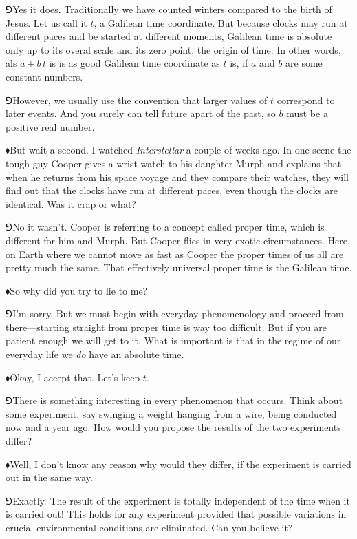 \documentclass[10pt,oneside%
]{memoir}
\newcommand{\hea}{\(\blacklozenge\)\;}
\newcommand{\heb}{\(\Game\)\;}
\begin{document}
\heb Yes it does. Traditionally we have counted winters compared to the birth of Jesus. Let us call it \(t\), a Galilean time coordinate. But because clocks may run at different paces and be started at different moments, Galilean time is absolute only up to its overal scale and its zero point, the origin of time. In other words, als \(a+b\,t\) is is as good Galilean time coordinate as \(t\) is, if \(a\) and \(b\) are some constant numbers.%

\heb However, we usually use the convention that larger values of \(t\) correspond to later events. And you surely can tell future apart of the past, so \(b\) must be a positive real number.

\hea But wait a second. I watched \emph{Interstellar} a couple of weeks ago. In one scene the tough guy Cooper gives a wrist watch to his daughter Murph and explains that when he returns from his space voyage and they compare their watches, they will find out that the clocks have run at different paces, even though the clocks are identical. Was it crap or what?

\heb No it wasn't. Cooper is referring to a concept called proper time, which is different for him and Murph. But Cooper flies in very exotic circumstances. Here, on Earth where we cannot move as fast as Cooper the proper times of us all are pretty much the same. That effectively universal proper time is the Galilean time.

\hea So why did you try to lie to me?

\heb I'm sorry. But we must begin with everyday phenomenology and proceed from there---starting straight from proper time is way too difficult. But if you are patient enough we will get to it. What is important is that in the regime of our everyday life we \emph{do} have an absolute time.

\hea Okay, I accept that. Let's keep \(t\).

\heb There is something interesting in every phenomenon that occurs. Think about some experiment, say swinging a weight hanging from a wire, being conducted now and a year ago. How would you propose the results of the two experiments differ?

\hea Well, I don't know any reason why would they differ, if the experiment is carried out in the same way.

\heb Exactly. The result of the experiment is totally independent of the time when it is carried out! This holds for any experiment provided that possible variations in crucial environmental conditions are eliminated. Can you believe it?
\end{document}
